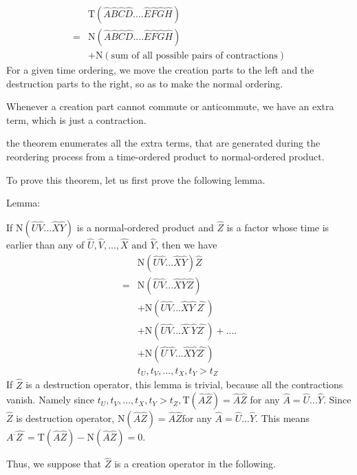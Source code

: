 ﻿\documentclass[twoside]{book}
\numberwithin{equation}{section}
\begin{document}
\begin{align}
&\mathrm{T}(\hat{A}\hat{B}\hat{C}\hat{D}....\hat{E}\hat{F}\hat{G}\hat{H}) \nonumber \\
=&\mathrm{N}(\hat{A}\hat{B}\hat{C}\hat{D}....\hat{E}\hat{F}\hat{G}\hat{H}) \nonumber \\
&+\mathrm{N}(\text{sum of all possible pairs of contractions}) \nonumber 
\end{align}
For a given time ordering, we move the creation parts to the left and the destruction parts to the right, so as to make the normal ordering.

Whenever a creation part cannot commute or anticommute, we have an extra term, which is just a contraction.

the theorem enumerates all the extra terms, that are generated during the reordering process from a time-ordered product to normal-ordered product.

To prove this theorem, let us first prove the following lemma.

Lemma:

If $\mathrm{N}(\hat{U}\hat{V}...\hat{X}\hat{Y})$ is a normal-ordered product and $\hat{Z}$ is a factor whose time is earlier than any of $\hat{U},\hat{V},...,\hat{X} \text{ and } \hat{Y}$, then we have
\begin{align}
&\mathrm{N}(\hat{U}\hat{V}...\hat{X}\hat{Y})\hat{Z} \nonumber \\
=&\mathrm{N}(\hat{U}\hat{V}...\hat{X}\hat{Y}\hat{Z})\nonumber \\
&+\mathrm{N}(\hat{U}\hat{V}...\hat{X}\hat{Y^{\cdot}}\hat{Z^{\cdot}})\nonumber \\
&+\mathrm{N}(\hat{U}\hat{V}...\hat{X^{\cdot}}\hat{Y}\hat{Z^{\cdot}})+....\nonumber \\
&+\mathrm{N}(\hat{U^{\cdot}}\hat{V}...\hat{X}\hat{Y}\hat{Z^{\cdot}})\nonumber \\
& t_U,t_V,...,t_X,t_Y>t_Z \nonumber
\end{align}
If $\hat{Z}$ is a destruction operator, this lemma is trivial, because all the contractions vanish. Namely since $t_U,t_V,...,t_X,t_Y>t_Z,\mathrm{T}(\hat{A}\hat{Z})=\hat{A}\hat{Z}$ for any $\hat{A}=\hat{U}...\hat{Y}$. Since $\hat{Z}$ is destruction operator, $\mathrm{N}(\hat{A}\hat{Z})=\hat{A}\hat{Z}$for any $\hat{A}=\hat{U}...\hat{Y}$. This means $\hat{A^{\cdot}}\hat{Z^{\cdot}}=\mathrm{T}(\hat{A}\hat{Z})-\mathrm{N}(\hat{A}\hat{Z})=0$.

Thus, we suppose that $\hat{Z}$ is a creation operator in the following.
\end{document}
